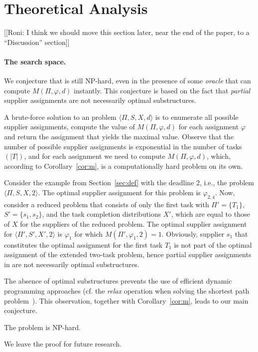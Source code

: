 \section{Theoretical Analysis}
[[Roni: I think we should move this section later, near the end of the paper, to a ``Discussion'' section]]

\paragraph{The \samd search space.}
We conjecture that \samd is still NP-hard, even in the presence of some \emph{oracle} that can compute $M(\Pi, \varphi, d)$ instantly. This conjecture is based on the fact that 
\emph{partial} supplier assignments are not necessarily  optimal substructures. 


A brute-force solution to an \samd problem $\langle 
\Pi, S, X, d \rangle$ is to enumerate all possible supplier assignments, 
compute the value of $M(\Pi,\varphi, d)$ for each assignment $\varphi$ and return the assignment that yields the maximal value. Observe that the number of possible supplier assignments is exponential in the number of tasks $(|T|)$, and for each assignment we need to compute $M(\Pi, \varphi, d)$, which, according to Corollary~\ref{cor:m}, is a computationally hard problem on its own. 


Consider the example from Section~\ref{sec:def} with the deadline 2, i.e., the \samd problem $\langle \Pi, S, X, 2\rangle$. The optimal supplier assignment for this problem is $\varphi_{2,4}$. Now, consider a reduced problem that consists of only the first task with $\Pi'=\{T_1\}$, $S'=\{s_1,s_2\}$, and the task completion distributions $X'$, which are equal to those of $X$ for the suppliers of the reduced problem. The optimal supplier assignment for $\langle \Pi', S', X', 2\rangle$ is $\varphi_{1}$ for which $M(\Pi',\varphi_{1}, 2)=1$. Obviously, supplier $s_1$ that constitutes the optimal assignment for the first task $T_1$ is not part of the optimal assignment of the extended two-task problem, hence partial supplier assignments in \samd are not necessarily optimal substructures. 

The absence of optimal substructures prevents the use of efficient dynamic programming approaches (cf. the \emph{relax} operation when solving the shortest path problem~\citep{bellman1958routing,dijkstra1959note}). This observation, together with Corollary~\ref{cor:m}, leads to our main conjecture.
\begin{conjecture}
The \samd problem is NP-hard.
\end{conjecture}
We leave the proof for future research.

